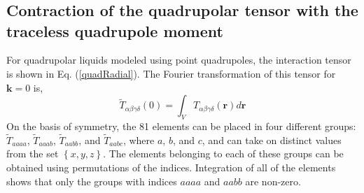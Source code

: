 %
%
%
%
%
%
%
%

%
%

\chapter{}

\section{Contraction of the quadrupolar tensor with the traceless
  quadrupole moment}
\label{ap:quadContraction}
For quadrupolar liquids modeled using point quadrupoles, the
interaction tensor is shown in Eq. (\ref{quadRadial}).  The Fourier
transformation of this tensor for $ \mathbf{k} = 0$ is,
\begin{equation}
\tilde{T}_{\alpha\beta\gamma\delta}(0) = \int_V T_{\alpha\beta\gamma\delta}(\mathbf{r}) d \mathbf{r}
\end{equation}
On the basis of symmetry, the 81 elements can be placed in four
different groups: $\tilde{T}_{aaaa}$, $\tilde{T}_{aaab}$,
$\tilde{T}_{aabb}$, and $\tilde{T}_{aabc}$, where $a$, $b$, and $c$,
and can take on distinct values from the set $\left\{x, y, z\right\}$.
The elements belonging to each of these groups can be obtained using
permutations of the indices.  Integration of all of the elements shows
that only the groups with indices ${aaaa}$ and ${aabb}$ are non-zero.

